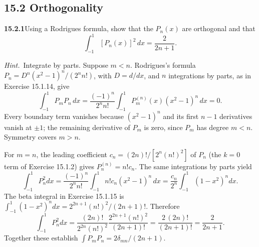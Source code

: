 \subsection*{15.2 Orthogonality}

\par\bigskip
\noindent\textbf{15.2.1}\quad Using a Rodrigues formula, show that the
$P_{n}(x)$ are orthogonal and that
\[
\int_{-1}^{1}[P_{n}(x)]^{2}\,dx=\frac{2}{2n+1}.
\]
\par\emph{Hint.}~Integrate by parts.
\solution
Suppose $m<n$. Rodrigues's formula
$P_n=D^n(x^2-1)^n/(2^nn!)$, with $D=d/dx$, and $n$ integrations by
parts, as in
Exercise 15.1.14, give
\[
\int_{-1}^1P_mP_n\,dx
=\frac{(-1)^n}{2^nn!}\int_{-1}^1P_m^{(n)}(x)(x^2-1)^n\,dx=0.
\]
Every boundary term vanishes because $(x^2-1)^n$ and its first $n-1$
derivatives vanish at $\pm1$; the remaining derivative of $P_m$ is zero,
since $P_m$ has degree $m<n$. Symmetry covers $m>n$.

For $m=n$, the leading coefficient
$c_n=(2n)!/[2^n(n!)^2]$ of $P_n$ (the $k=0$ term of Exercise 15.1.2)
gives $P_n^{(n)}=n!c_n$.
The same integrations by parts yield
\[
\int_{-1}^1P_n^2dx
=\frac{(-1)^n}{2^nn!}\int_{-1}^1n!c_n(x^2-1)^n\,dx
=\frac{c_n}{2^n}\int_{-1}^1(1-x^2)^n dx.
\]
The beta integral in Exercise 15.1.15 is
$\int_{-1}^1(1-x^2)^ndx=2^{2n+1}(n!)^2/(2n+1)!$. Therefore
\[
\int_{-1}^1P_n^2dx
=\frac{(2n)!}{2^{2n}(n!)^2}
\frac{2^{2n+1}(n!)^2}{(2n+1)!}
=\frac{2\,(2n)!}{(2n+1)!}
=\boxed{\frac2{2n+1}}.
\]
Together these establish $\int P_mP_n=2\delta_{mn}/(2n+1)$.

